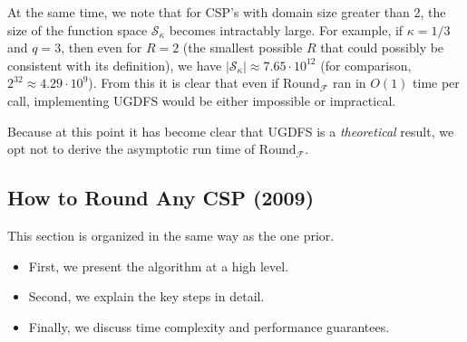 \documentclass[letterpaper, 12pt]{article}
\numberwithin{equation}{section}
\begin{document}
At the same time, we note that for CSP's with domain size greater than 2, the size of the function space $\mathcal{S}_\kappa$ becomes intractably large. For example, if $\kappa = 1/3$ and $q = 3$, then even for $R = 2$ (the smallest possible $R$ that could possibly be consistent with its definition), we have $|\mathcal{S}_\kappa| \approx 7.65\cdot 10^{12}$ (for comparison, $2^{32} \approx 4.29\cdot 10^9$). From this it is clear that even if $\text{Round}_{\mathcal{F}}$ ran in $O(1)$ time per call, implementing UGDFS would be either impossible or impractical.

Because at this point it has become clear that UGDFS is a \textit{theoretical} result, we opt not to derive the asymptotic run time of $\text{Round}_{\mathcal{F}}$.
\newpage
\subsection{How to Round Any CSP (2009)}
This section is organized in the same way as the one prior.
\begin{itemize}
\item First, we present the algorithm at a high level.
\item Second, we explain the key steps in detail.
\item Finally, we discuss time complexity and performance guarantees.
\end{itemize}
\end{document}

